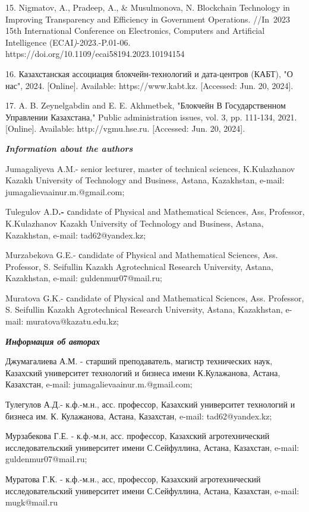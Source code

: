 15. Nigmatov, A., Pradeep, A., \& Musulmonova, N. Blockchain Technology
in Improving Transparency and Efficiency in Government Operations.
//In~2023 15th International Conference on Electronics, Computers and
Artificial Intelligence (ECAI\emph{)}-2023.-P.01-06.
https://doi.org/10.1109/ecai58194.2023.10194154

16. Казахстанская ассоциация блокчейн-технологий и дата-центров (КАБТ),
"О нас", 2024. {[}Online{]}. Available: https://www.kabt.kz.
{[}Accessed: Jun. 20, 2024{]}.

17. A. B. Zeynelgabdin and E. E. Akhmetbek, "Блокчейн В Государственном
Управлении Казахстана," Public administration issues, vol. 3, pp.
111-134, 2021. {[}Online{]}. Available: http://vgmu.hse.ru. {[}Accessed:
Jun. 20, 2024{]}.

\emph{\textbf{Information about the authors}}

Jumagaliyeva A.M.- senior lecturer, master of technical sciences,
K.Kulazhanov Kazakh University of Technology and Business, Astana,
Kazakhstan, e-mail: jumagalievaainur.m.@gmail.com;

Tulegulov A.D\textbf{.-} сandidate of Physical and Mathematical
Sciences, Ass, Professor, K.Kulazhanov Kazakh University of Technology
and Business, Astana, Kazakhstan, e-mail: tad62@yandex.kz;

Murzabekova G.E.- сandidate of Physical and Mathematical Sciences, Ass.
Professor, S. Seifullin Kazakh Agrotechnical Research University,
Astana, Kazakhstan, e-mail: guldenmur07@mail.ru;

Muratova G.K.- сandidate of Physical and Mathematical Sciences, Ass.
Professor, S. Seifullin Kazakh Agrotechnical Research University,
Astana, Kazakhstan, e-mail: muratova@kazatu.edu.kz;

\emph{\textbf{Информация об авторах}}

Джумагалиева А.М. - старший преподаватель, магистр технических наук,
Казахский университет технологий и бизнеса имени К.Кулажанова, Астана,
Казахстан, e-mail: jumagalievaainur.m.@gmail.com;

Тулегулов А.Д.- к.ф.-м.н., асс. профессор, Казахский университет
технологий и бизнеса им. К. Кулажанова, Астана, Казахстан, e-mail:
tad62@yandex.kz;

Мурзабекова Г.Е. - к.ф.-м.н, асс. профессор, Казахский агротехнический
исследовательский университет имени С.Сейфуллина, Астана, Казахстан,
e-mail: guldenmur07@mail.ru;

Муратова Г.К. - к.ф.-м.н., асс, профессор, Казахский агротехнический
исследовательский университет имени С.Сейфуллина, Астана, Казахстан,
e-mail: mugk@mail.ru
